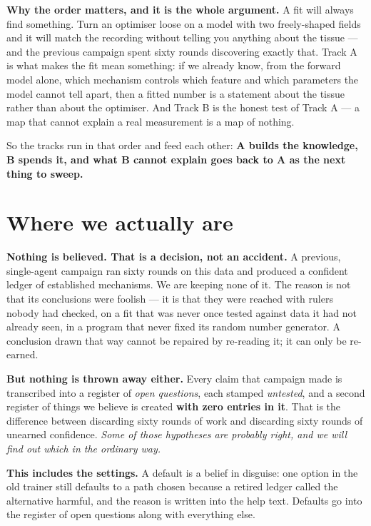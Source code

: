 \documentclass[11pt,a4paper]{article}
\begin{document}
\textbf{Why the order matters, and it is the whole argument.} A fit will always find something. Turn
an optimiser loose on a model with two freely-shaped fields and it will match the recording without
telling you anything about the tissue --- and the previous campaign spent sixty rounds discovering
exactly that. Track A is what makes the fit mean something: if we already know, from the forward
model alone, which mechanism controls which feature and which parameters the model cannot tell
apart, then a fitted number is a statement about the tissue rather than about the optimiser. And
Track B is the honest test of Track A --- a map that cannot explain a real measurement is a map of
nothing.

So the tracks run in that order and feed each other: \textbf{A builds the knowledge, B spends it,
and what B cannot explain goes back to A as the next thing to sweep.}

\section{Where we actually are}

\textbf{Nothing is believed. That is a decision, not an accident.} A previous, single-agent campaign
ran sixty rounds on this data and produced a confident ledger of established mechanisms. We are
keeping none of it. The reason is not that its conclusions were foolish --- it is that they were
reached with rulers nobody had checked, on a fit that was never once tested against data it had not
already seen, in a program that never fixed its random number generator. A conclusion drawn that way
cannot be repaired by re-reading it; it can only be re-earned.

\textbf{But nothing is thrown away either.} Every claim that campaign made is transcribed into a
register of \emph{open questions}, each stamped \emph{untested}, and a second register of things we
believe is created \textbf{with zero entries in it}. That is the difference between discarding
sixty rounds of work and discarding sixty rounds of unearned confidence. \emph{Some of those
hypotheses are probably right, and we will find out which in the ordinary way.}

\textbf{This includes the settings.} A default is a belief in disguise: one option in the old
trainer still defaults to a path chosen because a retired ledger called the alternative harmful, and
the reason is written into the help text. Defaults go into the register of open questions along with
everything else.
\end{document}
